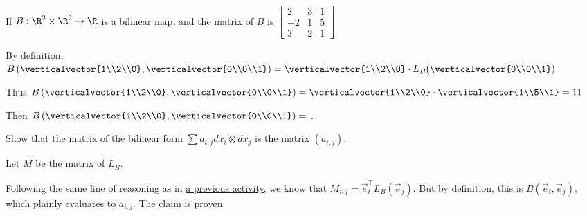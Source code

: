 \documentclass{ximera}
\begin{document}
\begin{question}
  If $B: \R^3 \times \R^3 \to \R$ is a bilinear map, and the matrix of $B$ is 
  \(\begin{bmatrix} 2 & 3 & 1 \\ -2  & 1& 5\\ 3&2 & 1\end{bmatrix}\)
  \begin{solution}
    \begin{hint}
      By definition, $B\left( \verticalvector{1\\2\\0}, \verticalvector{0\\0\\1}\right) = \verticalvector{1\\2\\0} \cdot L_B(\verticalvector{0\\0\\1})$
    \end{hint}
    \begin{hint}
      Thus $B\left( \verticalvector{1\\2\\0}, \verticalvector{0\\0\\1}\right) = \verticalvector{1\\2\\0} \cdot \verticalvector{1\\5\\1} = 11$
    \end{hint}
    Then $B\left( \verticalvector{1\\2\\0}, \verticalvector{0\\0\\1}\right) =$ .
  \end{solution}
\end{question}

Show that the matrix of the bilinear form $\sum a_{i,j} dx_i \otimes dx_j$ is the matrix $(a_{i,j})$.

\begin{free-response}
  Let $M$ be the matrix of $L_B$.
		
  Following the same line of reasoning as in \href{http://ximera.osu.edu/course/kisonecat/m2o2c2/course/activity/week1/inner-product/multiply-dot/}{a previous activity}, we 
  know that $M_{i,j} = \vec{e}_i^\top L_B(\vec{e}_j)$.  But by definition, this is 	$B(\vec{e}_i,\vec{e}_j)$, which plainly evaluates to $a_{i,j}$.   The claim is proven.
\end{free-response}
	
\end{document}
